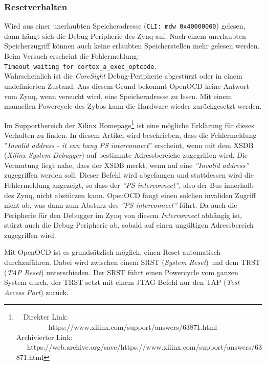 \subsubsection{Resetverhalten}
Wird aus einer unerlaubten Speicheradresse (\texttt{CLI: mdw 0x40000000}) gelesen, dann hängt sich die Debug-Peripherie des Zynq auf.
Nach einem unerlaubten Speicherzugriff können auch keine erlaubten Speicherstellen mehr gelesen werden.
Beim Versuch erscheint die Fehlermeldung:\\
\texttt{Timeout waiting for cortex\_a\_exec\_optcode}.\\
Wahrscheinlich ist die \textit{CoreSight} Debug-Peripherie abgestürzt oder in einem undefinierten Zustand.
Aus diesem Grund bekommt OpenOCD keine Antwort vom Zynq, wenn versucht wird, eine Speicheradresse zu lesen.
Mit einem manuellen Powercycle des Zybos kann die Hardware wieder zurückgesetzt werden.

Im Supportbereich der Xilinx Homepage\footnote{\ \ Direkter Link: \ \ \ \ \ \ \ \ \ https://www.xilinx.com/support/answers/63871.html\\ Archivierter Link: \ \ \ https://web.archive.org/save/https://www.xilinx.com/support/answers/63871.html} ist eine mögliche Erklärung für dieses Verhalten zu finden.
In diesem Artikel wird beschrieben, dass die Fehlermeldung ''\textit{Invalid address - it can hang PS interconnect}'' erscheint, wenn mit dem XSDB (\textit{Xilinx System Debugger}) auf bestimmte Adressbereiche zugegriffen wird.
Die Vermutung liegt nahe, dass der XSDB merkt, wenn auf eine \textit{''Invalid address''} zugegriffen werden soll.
Dieser Befehl wird abgefangen und stattdessen wird die Fehlermeldung angezeigt, so dass der \textit{''PS interconnect''}, also der Bus innerhalb des Zynq, nicht abstürzen kann.
OpenOCD fängt einen solchen invaliden Zugriff nicht ab, was dann zum Absturz des \textit{''PS interconnect''} führt.
Da auch die Peripherie für den Debugger im Zynq von diesem \textit{Interconnect} abhängig ist, stürzt auch die Debug-Peripherie ab, sobald auf einen ungültigen Adressbereich zugegriffen wird.

Mit OpenOCD ist es grundsätzlich möglich, einen Reset automatisch durchzuführen.
Dabei wird zwischen einem SRST (\textit{System Reset}) und dem TRST (\textit{TAP Reset}) unterschieden.
Der SRST führt einen Powercycle vom ganzen System durch, der TRST setzt mit einem JTAG-Befehl nur den TAP (\textit{Test Access Port}) zurück.

